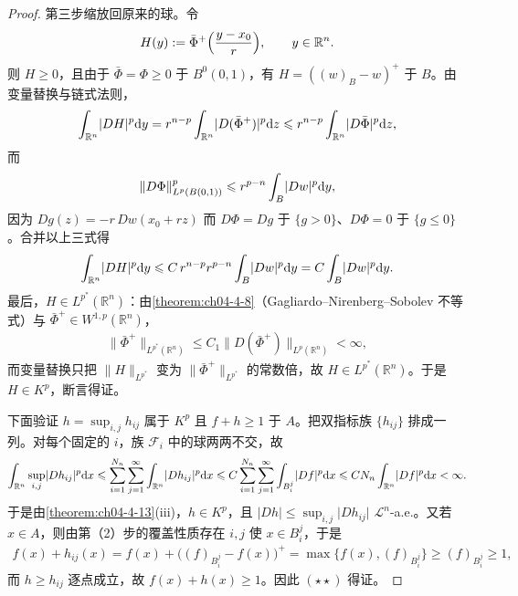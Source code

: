\documentclass[../../main.tex]{subfiles}%
\begin{document}
\begin{proof}
第三步缩放回原来的球。令
\begin{align*}
H(y):=\bar\Phi^+\Bigl(\frac{y-x_0}{r}\Bigr),\qquad y\in\mathbb{R}^n .
\end{align*}
则 $H\geqslant0$，且由于 $\bar\Phi=\Phi\geqslant0$ 于 $B^0(0,1)$，有 $H=((w)_B-w)^+$ 于 $B$。由变量替换与链式法则，
\begin{align*}
\int_{\mathbb{R}^n}\lvert DH\rvert^p\mathrm{d} y=r^{n-p}\int_{\mathbb{R}^n}\lvert D(\bar\Phi^+)\rvert^p\mathrm{d} z\leqslant r^{n-p}\int_{\mathbb{R}^n}\lvert D\bar\Phi\rvert^p\mathrm{d} z ,
\end{align*}
而
\begin{align*}
\lVert D\Phi\rVert_{L^p(B(0,1))}^p\leqslant r^{p-n}\int_B\lvert Dw\rvert^p\mathrm{d} y ,
\end{align*}
因为 $Dg(z)=-r\,Dw(x_0+rz)$ 而 $D\Phi=Dg$ 于 $\{g>0\}$、$D\Phi=0$ 于 $\{g\leqslant0\}$。合并以上三式得
\begin{align*}
\int_{\mathbb{R}^n}\lvert DH\rvert^p\mathrm{d} y\leqslant C\,r^{n-p}r^{p-n}\int_B\lvert Dw\rvert^p\mathrm{d} y=C\int_B\lvert Dw\rvert^p\mathrm{d} y .
\end{align*}
最后，$H\in L^{p^*}(\mathbb{R}^n)$：由\cref{theorem:ch04-4-8}（Gagliardo--Nirenberg--Sobolev 不等式）与 $\bar\Phi^+\in W^{1,p}(\mathbb{R}^n)$， %
\begin{align*}
\lVert\bar\Phi^+\rVert_{L^{p^*}(\mathbb{R}^n)}\leqslant C_1\lVert D(\bar\Phi^+)\rVert_{L^p(\mathbb{R}^n)}<\infty ,%
\end{align*}
而变量替换只把 $\lVert H\rVert_{L^{p^*}}$ 变为 $\lVert\bar\Phi^+\rVert_{L^{p^*}}$ 的常数倍，故 $H\in L^{p^*}(\mathbb{R}^n)$。于是 $H\in K^p$，断言得证。

下面验证 $h=\sup_{i,j}h_{ij}$ 属于 $K^p$ 且 $f+h\geqslant1$ 于 $A$。把双指标族 $\{h_{ij}\}$ 排成一列。对每个固定的 $i$，族 $\mathcal{F}_i$ 中的球两两不交，故
\begin{align*}
\int_{\mathbb{R}^n}\sup_{i,j}\lvert Dh_{ij}\rvert^p\mathrm{d} x\leqslant\sum_{i=1}^{N_n}\sum_{j=1}^{\infty}\int_{\mathbb{R}^n}\lvert Dh_{ij}\rvert^p\mathrm{d} x\leqslant C\sum_{i=1}^{N_n}\sum_{j=1}^{\infty}\int_{B_i^j}\lvert Df\rvert^p\mathrm{d} x\leqslant CN_n\int_{\mathbb{R}^n}\lvert Df\rvert^p\mathrm{d} x<\infty .
\end{align*}
于是由\cref{theorem:ch04-4-13}(iii)，$h\in K^p$，且 $\lvert Dh\rvert\leqslant\sup_{i,j}\lvert Dh_{ij}\rvert$ $\mathcal{L}^n$-a.e.。又若 $x\in A$，则由第（2）步的覆盖性质存在 $i,j$ 使 $x\in B_i^j$，于是 %
\begin{align*}
f(x)+h_{ij}(x)=f(x)+\bigl((f)_{B_i^j}-f(x)\bigr)^+=\max\bigl\{f(x),(f)_{B_i^j}\bigr\}\geqslant(f)_{B_i^j}\geqslant1 ,%
\end{align*}
而 $h\geqslant h_{ij}$ 逐点成立，故 $f(x)+h(x)\geqslant1$。因此 $(\star\star)$ 得证。


\end{proof}
\end{document}
